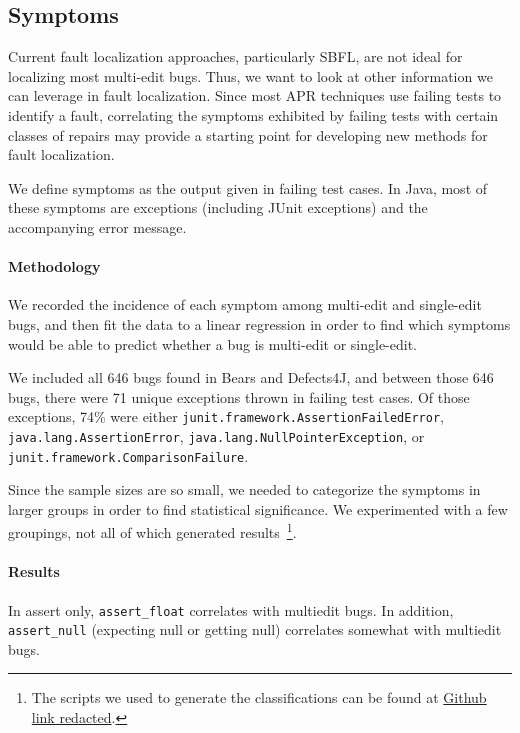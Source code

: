 \subsection{Symptoms}


Current fault localization approaches, particularly SBFL, are not ideal for localizing most multi-edit 
bugs. Thus, we want to look at other information we can leverage in fault localization. Since most 
APR techniques use failing tests to identify a fault, correlating the symptoms exhibited by failing 
tests with certain classes of repairs may provide a starting point for developing new methods for 
fault localization.

We define symptoms as the output given in failing test cases. In Java, most of 
these symptoms are exceptions (including JUnit exceptions) and the accompanying error message.

\paragraph{Methodology}
We recorded the incidence of each symptom among multi-edit and single-edit bugs, and then fit the 
data to a linear regression in order to find which symptoms would be able to predict whether a bug 
is multi-edit or single-edit.

We included all 646 bugs found in Bears and Defects4J, and between those 646 bugs, there were 
71 unique exceptions thrown in failing test cases. Of those exceptions, 74\% were either 
\lstinline{junit.framework.AssertionFailedError}, \lstinline{java.lang.AssertionError}, 
\lstinline{java.lang.NullPointerException}, or \lstinline{junit.framework.ComparisonFailure}.

Since the sample sizes are so small, we needed to categorize the symptoms in larger groups in order 
to find statistical significance. We experimented with a few groupings, not all of which generated 
results~\footnote{The scripts we used to generate the classifications can be found at \url{Github link 
redacted}.}.  



\paragraph{Results}
In assert only, \lstinline{assert_float} correlates with multiedit bugs. In addition, \lstinline{assert_null} (expecting null or getting null) correlates somewhat with multiedit bugs.

